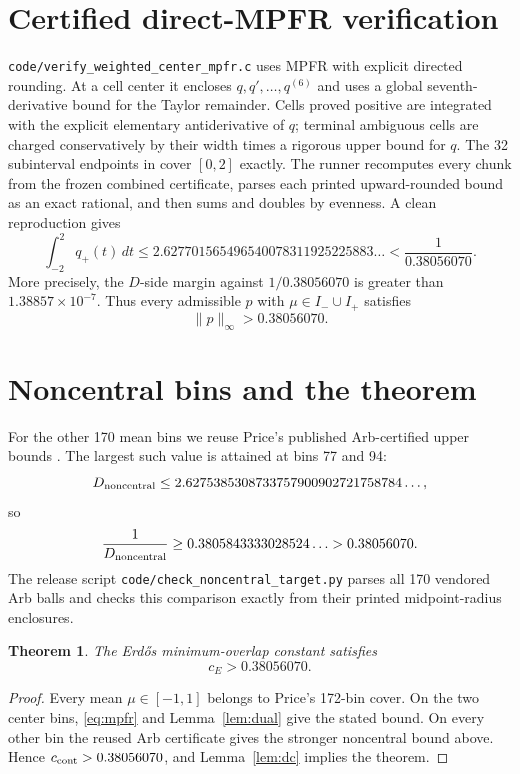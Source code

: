 \documentclass[11pt]{amsart}
\newtheorem{theorem}{Theorem}
\newcommand{\dd}{\,d}
\begin{document}
\section{Certified direct-MPFR verification}
\texttt{code/verify\_weighted\_center\_mpfr.c} uses MPFR with explicit directed
rounding.  At a cell center it encloses $q,q',\ldots,q^{(6)}$ and uses a global
seventh-derivative bound for the Taylor remainder.  Cells proved positive are
integrated with the explicit elementary antiderivative of $q$; terminal
ambiguous cells are charged conservatively by their width times a rigorous upper
bound for $q$.  The 32 subinterval endpoints in
 cover $[0,2]$
exactly.  The runner recomputes every chunk from the frozen combined
certificate, parses each printed upward-rounded bound as an exact rational, and
then sums and doubles by evenness.  A clean reproduction gives
\begin{equation}\label{eq:mpfr}
 \int_{-2}^{2}q_+(t)\dd t
 \le 2.627701565496540078311925225883\ldots
 <\frac1{0.38056070}.
\end{equation}
More precisely, the $D$-side margin against $1/0.38056070$ is greater than
$1.38857\times10^{-7}$.  Thus every admissible $p$ with
$\mu\in I_-\cup I_+$ satisfies
\[
 \|p\|_\infty>0.38056070.
\]

\section{Noncentral bins and the theorem}
For the other 170 mean bins we reuse Price's published Arb-certified upper
bounds \cite{Price2026}.  The largest such value is attained at bins 77 and 94:
\[
 D_{\rm noncentral}
 \le2.6275385308733757900902721758784\ldots,
\]
so
\[
 \frac1{D_{\rm noncentral}}
 \ge0.3805843333028524\ldots>0.38056070.
\]
The release script \texttt{code/check\_noncentral\_target.py} parses all 170
vendored Arb balls and checks this comparison exactly from their printed
midpoint-radius enclosures.

\begin{theorem}\label{thm:main}
The Erd\H{o}s minimum-overlap constant satisfies
\[
 \boxed{c_E>0.38056070}.
\]
\end{theorem}
\begin{proof}
Every mean $\mu\in[-1,1]$ belongs to Price's 172-bin cover.  On the two center
bins, \eqref{eq:mpfr} and Lemma~\ref{lem:dual} give the stated bound.  On every
other bin the reused Arb certificate gives the stronger noncentral bound above.
Hence $c_{\rm cont}>0.38056070$, and Lemma~\ref{lem:dc} implies the theorem.
\end{proof}
\end{document}
